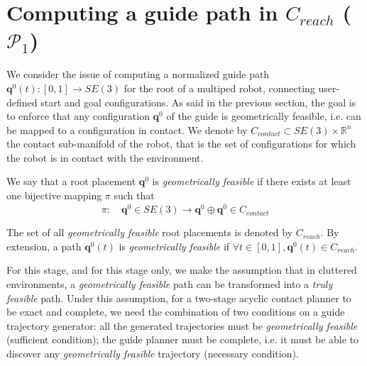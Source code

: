 \section{Computing a guide path in $C_{reach}$ ($\mathcal{P}_1$) }
\label{rbprm}

We consider the issue of computing a normalized guide path $\mathbf{q}^0(t) : [0,1] \longrightarrow SE(3)$ for the root of a multiped robot, connecting user-defined start and goal configurations. As said in the previous section, the goal is to enforce that any configuration $\mathbf{q}^0$ of the guide is geometrically feasible, i.e. can be mapped to a configuration in contact. We denote by $C_{contact} \subset SE(3) \times \mathbb{R}^n$ the contact sub-manifold of the robot, that is the set of configurations for which the robot is in contact with the environment.

We say that a root placement $\mathbf{q}^{0}$ is \textit{geometrically feasible} if there exists at least one bijective mapping $\pi$
such that
\begin{equation}
    \pi\colon \quad \mathbf{q}^{0} \in  SE(3) \longrightarrow  \mathbf{q}^{0} \oplus \mathbf{q}^{\overline{0}} \in C_{contact} 
    \label{eq:pi}
\end{equation}

The set of all \textit{geometrically feasible} root placements is denoted by $C_{reach}$. By extension, a path $\mathbf{q}^0(t)$ is \textit{geometrically feasible} if $\forall t \in [0,1], \mathbf{q}^0(t) \in C_{reach}$.

For this stage, and for this stage only, we make the assumption that in cluttered environments, a \textit{geometrically feasible} path can be transformed into a \textit{truly feasible} path.
Under this assumption, for a two-stage acyclic contact planner to be exact and complete, we need the combination of two conditions on a guide trajectory generator: all the generated trajectories must be \textit{geometrically feasible} (sufficient condition); the guide planner must be complete, i.e. it must be able to discover any \textit{geometrically feasible} trajectory (necessary condition).


